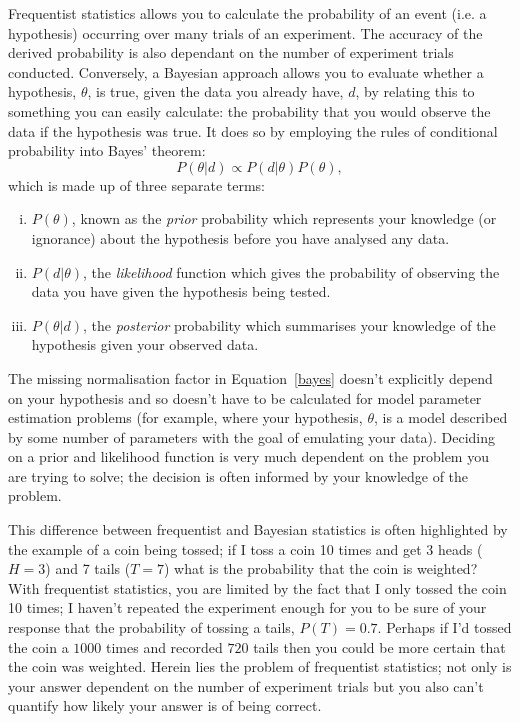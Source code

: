 Frequentist statistics allows you to calculate the probability of an event (i.e. a hypothesis) occurring over many trials of an experiment. The accuracy of the derived probability is also dependant on the number of experiment trials conducted. Conversely, a Bayesian approach allows you to evaluate whether a hypothesis, $\theta$, is true, given the data you already have, $d$, by relating this to something you can easily calculate: the probability that you would observe the data if the hypothesis was true. It does so by employing the rules of conditional probability into Bayes' theorem:
\begin{equation}\label{bayes}
P(\theta|d) \propto P(d | \theta)P(\theta),
\end{equation}
which is made up of three separate terms: 
\begin{enumerate}[(i)]
\item $P(\theta)$, known as the \emph{prior} probability which represents your knowledge (or ignorance) about the hypothesis before you have analysed any data. 
\item $P(d  | \theta)$, the \emph{likelihood} function which gives the probability of observing the data you have given the hypothesis being tested. 
\item $P(\theta | d)$, the \emph{posterior} probability which summarises your knowledge of the hypothesis given your observed data.
\end{enumerate}
The missing normalisation factor in Equation~\ref{bayes} doesn't explicitly depend on your hypothesis and so doesn't have to be calculated for model parameter estimation problems (for example, where your hypothesis, $\theta$, is a model described by some number of parameters with the goal of emulating your data). Deciding on a prior and likelihood function is very much dependent on the problem you are trying to solve; the decision is often informed by your knowledge of the problem. 

This difference between frequentist and Bayesian statistics is often highlighted by the example of a coin being tossed; if I toss a coin 10 times and get 3 heads ($H=3$) and 7 tails ($T=7$) what is the probability that the coin is weighted? With frequentist statistics, you are limited by the fact that I only tossed the coin 10 times; I haven't repeated the experiment enough for you to be sure of your response that the probability of tossing a tails,  $P(T)=0.7$. Perhaps if I'd tossed the coin a $1000$ times and recorded $720$ tails then you could be more certain that the coin was weighted. Herein lies the problem of frequentist statistics; not only is your answer dependent on the number of experiment trials but you also can't quantify how likely your answer is of being correct. 

